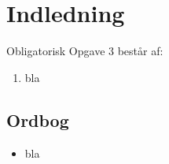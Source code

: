 \section{Indledning}
Obligatorisk Opgave 3 består af:

\begin{enumerate}
	\item bla
\end{enumerate}

\subsection{Ordbog}
\begin{itemize}
	\item bla
\end{itemize}

